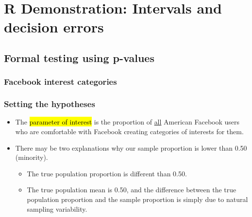 \documentclass[t,compress,mathserif]{beamer}
\begin{document}

\section{R Demonstration: Intervals and decision errors}


\subsection{Formal testing using p-values}


\begin{frame}
\frametitle{Facebook interest categories}


\vfill


\end{frame}


\begin{frame}
\frametitle{Setting the hypotheses}

\begin{itemize}

\item The \hl{parameter of interest} is the proportion of \underline{all} American Facebook users who are comfortable with Facebook creating categories of interests for them.

\pause

\item There may be two explanations why our sample proportion is lower than 0.50 (minority).
\begin{itemize}
\item The true population proportion is different than 0.50.
\item The true population mean is 0.50, and the difference between the true population proportion and the sample proportion is simply due to natural sampling variability.
\end{itemize}

 \end{itemize}

\end{frame}
\end{document}
